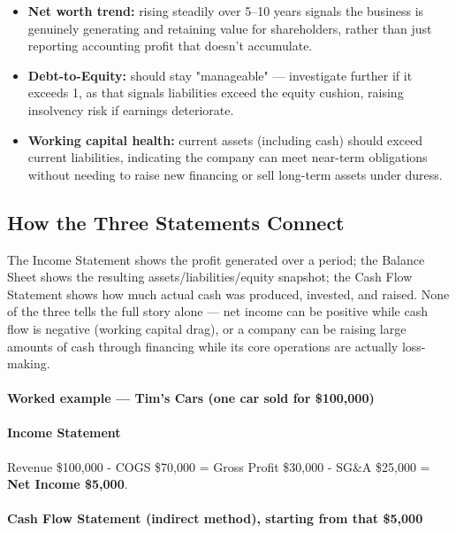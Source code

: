 \documentclass[12pt,openany]{book}
\begin{document}
\begin{itemize}[leftmargin=*]
    \item \textbf{Net worth trend:} rising steadily over 5--10 years signals the business is genuinely generating and retaining value for shareholders, rather than just reporting accounting profit that doesn't accumulate.
    \item \textbf{Debt-to-Equity:} should stay "manageable" --- investigate further if it exceeds 1, as that signals liabilities exceed the equity cushion, raising insolvency risk if earnings deteriorate.
    \item \textbf{Working capital health:} current assets (including cash) should exceed current liabilities, indicating the company can meet near-term obligations without needing to raise new financing or sell long-term assets under duress.
\end{itemize}

\subsection{How the Three Statements Connect}

The Income Statement shows the profit generated over a period; the Balance Sheet shows the resulting assets/liabilities/equity snapshot; the Cash Flow Statement shows how much actual cash was produced, invested, and raised. None of the three tells the full story alone --- net income can be positive while cash flow is negative (working capital drag), or a company can be raising large amounts of cash through financing while its core operations are actually loss-making.

\paragraph{Worked example --- Tim's Cars (one car sold for \$100,000)} 

\paragraph{Income Statement} Revenue \$100,000 - COGS \$70,000 = Gross Profit \$30,000 - SG\&A \$25,000 = \textbf{Net Income \$5,000}.

\paragraph{Cash Flow Statement (indirect method), starting from that \$5,000} 
\end{document}
